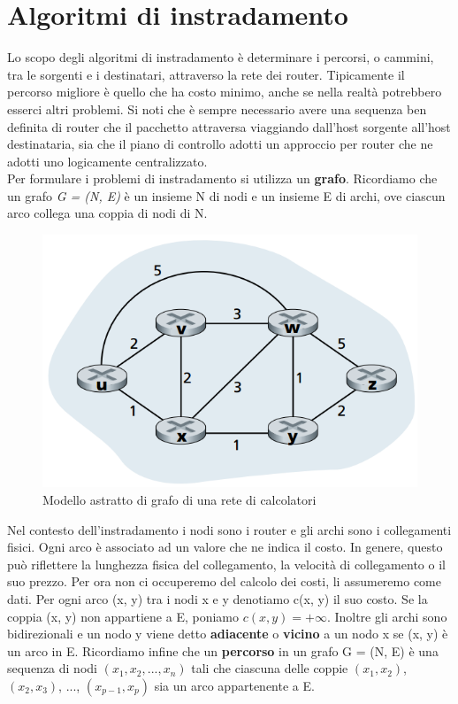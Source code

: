 \documentclass[11pt,a4paper]{book}
\begin{document}
\section{Algoritmi di instradamento}
Lo scopo degli algoritmi di instradamento è determinare i percorsi, o cammini, tra le sorgenti e i destinatari, attraverso la rete dei router. Tipicamente il percorso migliore è quello che ha costo minimo, anche se nella realtà potrebbero esserci altri problemi. Si noti che è sempre necessario avere una sequenza ben definita di router che il pacchetto attraversa viaggiando dall'host sorgente all'host destinataria, sia che il piano di controllo adotti un approccio per router che ne adotti uno logicamente centralizzato. \\
Per formulare i problemi di instradamento si utilizza un \textbf{grafo}. Ricordiamo che un grafo \textit{G = (N, E)} è un insieme N di nodi e un insieme E di archi, ove ciascun arco collega una coppia di nodi di N.
\begin{figure}
	\includegraphics[scale=0.7]{img/059.png}
	\caption{Modello astratto di grafo di una rete di calcolatori}
	\label{fig: 059}
\end{figure}
Nel contesto dell'instradamento i nodi sono i router e gli archi sono i collegamenti fisici. Ogni arco è associato ad un valore che ne indica il costo. In genere, questo può riflettere la lunghezza fisica del collegamento, la velocità di collegamento o il suo prezzo. Per ora non ci occuperemo del calcolo dei costi, li assumeremo come dati. Per ogni arco (x, y) tra i nodi x e y denotiamo c(x, y) il suo costo. Se la coppia (x, y) non appartiene a E, poniamo $c(x, y) = +\infty$. Inoltre gli archi sono bidirezionali e un nodo y viene detto \textbf{adiacente} o \textbf{vicino} a un nodo x se (x, y) è un arco in E. Ricordiamo infine che un \textbf{percorso} in un grafo G = (N, E) è una sequenza di nodi $(x_{1}, x_{2}, ..., x_{n})$ tali che ciascuna delle coppie $(x_{1}, x_{2})$, $(x_{2}, x_{3})$, ..., $(x_{p-1}, x_{p})$ sia un arco appartenente a E.\\
\end{document}
